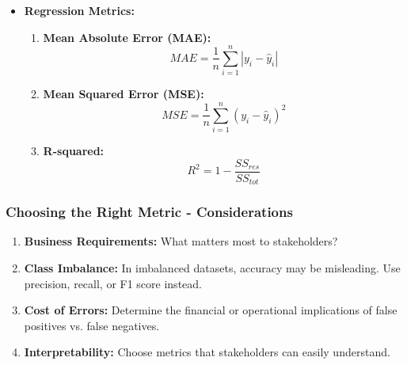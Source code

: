 \documentclass{beamer}
\begin{document}
\begin{frame}[fragile]
\begin{enumerate}
\begin{itemize}
                \item \textbf{Regression Metrics:}
                    \begin{enumerate}
                        \item \textbf{Mean Absolute Error (MAE):}
                            \begin{equation}
                                MAE = \frac{1}{n} \sum_{i=1}^{n} |y_i - \hat{y}_i|
                            \end{equation}
                        \item \textbf{Mean Squared Error (MSE):}
                            \begin{equation}
                                MSE = \frac{1}{n} \sum_{i=1}^{n} (y_i - \hat{y}_i)^2
                            \end{equation}
                        \item \textbf{R-squared:}
                            \begin{equation}
                                R^2 = 1 - \frac{SS_{res}}{SS_{tot}}
                            \end{equation}
                    \end{enumerate}
            \end{itemize}
    \end{enumerate}
\end{frame}

\begin{frame}[fragile]
    \frametitle{Choosing the Right Metric - Considerations}
    \begin{enumerate}
        \item \textbf{Business Requirements:} What matters most to stakeholders?
        \item \textbf{Class Imbalance:} In imbalanced datasets, accuracy may be misleading. Use precision, recall, or F1 score instead.
        \item \textbf{Cost of Errors:} Determine the financial or operational implications of false positives vs. false negatives.
        \item \textbf{Interpretability:} Choose metrics that stakeholders can easily understand.
    \end{enumerate}
\end{frame}
\end{document}

